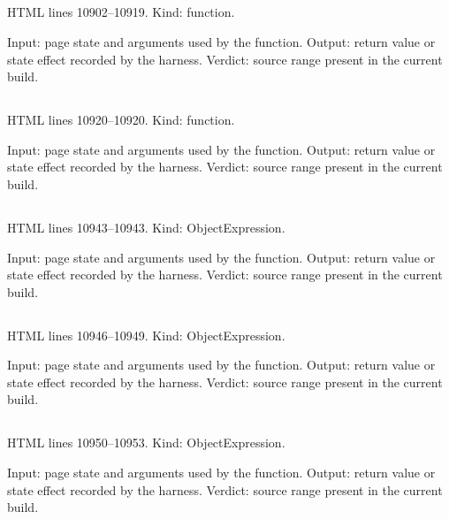 \subsection*{\texttt{}}
\label{vf_587_applyRawFilePriority}
HTML lines 10902--10919. Kind: function.

Input: page state and arguments used by the function.
Output: return value or state effect recorded by the harness.
Verdict: source range present in the current build.

\subsection*{\texttt{}}
\label{vf_588_runIsSuperseded}
HTML lines 10920--10920. Kind: function.

Input: page state and arguments used by the function.
Output: return value or state effect recorded by the harness.
Verdict: source range present in the current build.

\subsection*{\texttt{}}
\label{vf_589_PDF_PAGE}
HTML lines 10943--10943. Kind: ObjectExpression.

Input: page state and arguments used by the function.
Output: return value or state effect recorded by the harness.
Verdict: source range present in the current build.

\subsection*{\texttt{}}
\label{vf_590_PDF_WINANSI}
HTML lines 10946--10949. Kind: ObjectExpression.

Input: page state and arguments used by the function.
Output: return value or state effect recorded by the harness.
Verdict: source range present in the current build.

\subsection*{\texttt{}}
\label{vf_591_PDF_SPELL}
HTML lines 10950--10953. Kind: ObjectExpression.

Input: page state and arguments used by the function.
Output: return value or state effect recorded by the harness.
Verdict: source range present in the current build.

